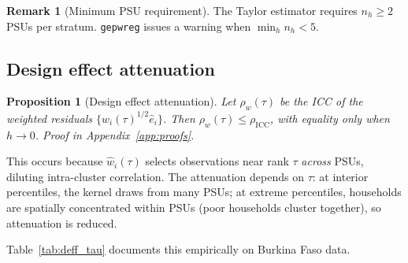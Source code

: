 \documentclass[12pt,a4paper]{article}
\newtheorem{proposition}{Proposition}
\theoremstyle{definition}
\newtheorem{remark}{Remark}
\newcommand{\hw}{\hat{w}}
\begin{document}
\begin{remark}[Minimum PSU requirement]
The Taylor estimator requires $n_h\geq 2$ PSUs per stratum.
\texttt{gepwreg} issues a warning when $\min_h n_h<5$.
\end{remark}

\subsection{Design effect attenuation}
\label{sec:svy:attenuation}

\begin{proposition}[Design effect attenuation]
\label{prop:deff}
Let $\rho_w(\tau)$ be the ICC of the weighted residuals
$\{\hw_i(\tau)^{1/2}\hat{e}_i\}$. Then $\rho_w(\tau)\leq
\rho_{\mathrm{ICC}}$, with equality only when $h\to 0$.
Proof in Appendix~\ref{app:proofs}.
\end{proposition}

This occurs because $\hw_i(\tau)$ selects observations near rank $\tau$
\textit{across} PSUs, diluting intra-cluster correlation. The attenuation
depends on $\tau$: at interior percentiles, the kernel draws from many
PSUs; at extreme percentiles, households are spatially concentrated
within PSUs (poor households cluster together), so attenuation is
reduced.

Table~\ref{tab:deff_tau} documents this empirically on Burkina Faso
data.

\begin{table}[htbp]\centering\small
\caption{Effective design effect by percentile, Burkina Faso 1998}
\label{tab:deff_tau}
\end{table}
\end{document}
